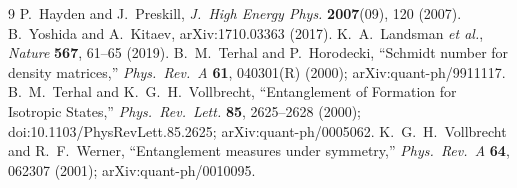 \documentclass[11pt,twocolumn]{article}
\begin{document}
\begin{thebibliography}{9}
 P.~Hayden and J.~Preskill, \emph{J.~High Energy Phys.} \textbf{2007}(09), 120 (2007).
 B.~Yoshida and A.~Kitaev, arXiv:1710.03363 (2017).
 K.~A.~Landsman \emph{et al.}, \emph{Nature} \textbf{567}, 61--65 (2019).
 B.~M.~Terhal and P.~Horodecki, ``Schmidt number for density matrices,'' \emph{Phys.\ Rev.\ A} \textbf{61}, 040301(R) (2000); arXiv:quant-ph/9911117.
 B.~M.~Terhal and K.~G.~H.~Vollbrecht, ``Entanglement of Formation for Isotropic States,'' \emph{Phys.\ Rev.\ Lett.} \textbf{85}, 2625--2628 (2000); doi:10.1103/PhysRevLett.85.2625; arXiv:quant-ph/0005062.
 K.~G.~H.~Vollbrecht and R.~F.~Werner, ``Entanglement measures under symmetry,'' \emph{Phys.\ Rev.\ A} \textbf{64}, 062307 (2001); arXiv:quant-ph/0010095.
\end{thebibliography}
\end{document}
